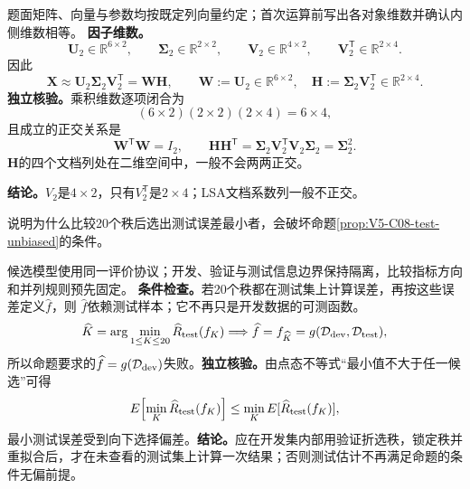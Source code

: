 \begin{solution}
\SolGiven 题面矩阵、向量与参数均按既定列向量约定；首次运算前写出各对象维数并确认内侧维数相等。
\SolDerive
\textbf{因子维数。}
\[
\boldsymbol U_2\in\mathbb R^{6\times2},\qquad
\boldsymbol\Sigma_2\in\mathbb R^{2\times2},\qquad
\boldsymbol V_2\in\mathbb R^{4\times2},\qquad
\boldsymbol V_2^{\mathsf T}\in\mathbb R^{2\times4}.
\]
因此
\[
\boldsymbol X\approx\boldsymbol U_2\boldsymbol\Sigma_2\boldsymbol V_2^{\mathsf T}
=\boldsymbol W\boldsymbol H,\qquad
\boldsymbol W:=\boldsymbol U_2\in\mathbb R^{6\times2},\quad
\boldsymbol H:=\boldsymbol\Sigma_2\boldsymbol V_2^{\mathsf T}
\in\mathbb R^{2\times4}.
\]
\textbf{独立核验。}乘积维数逐项闭合为
\[
(6\times2)(2\times2)(2\times4)=6\times4,
\]
且成立的正交关系是
\[
\boldsymbol W^{\mathsf T}\boldsymbol W=I_2,\qquad
\boldsymbol H\boldsymbol H^{\mathsf T}
=\boldsymbol\Sigma_2\boldsymbol V_2^{\mathsf T}\boldsymbol V_2\boldsymbol\Sigma_2
=\boldsymbol\Sigma_2^2.
\]
$\boldsymbol H$的四个文档列处在二维空间中，一般不会两两正交。

\textbf{结论。}$V_2$是$4\times2$，只有$V_2^{\mathsf T}$是$2\times4$；LSA文档系数列一般不正交。
\end{solution}
\begin{example}[锁定测试的条件无偏]\label{exm:V5-C08-holdout}
说明为什么比较20个秩后选出测试误差最小者，会破坏命题\ref{prop:V5-C08-test-unbiased}的条件。
\end{example}
\begin{solution}
\SolGiven 候选模型使用同一评价协议；开发、验证与测试信息边界保持隔离，比较指标方向和并列规则预先固定。
\SolDerive
\textbf{条件检查。}若20个秩都在测试集上计算误差，再按这些误差定义$\widehat f$，则
$\widehat f$依赖测试样本；它不再只是开发数据的可测函数。
\[
\widehat K=\arg\min_{1\le K\le20}\widehat R_{\rm test}(f_K)
\Longrightarrow
\widehat f=f_{\widehat K}=g(\mathcal D_{\rm dev},\mathcal D_{\rm test}),
\]
所以命题要求的$\widehat f=g(\mathcal D_{\rm dev})$失败。\textbf{独立核验。}由点态不等式“最小值不大于任一候选”可得
\[
E\!\left[\min_K\widehat R_{\rm test}(f_K)\right]
\le\min_KE[\widehat R_{\rm test}(f_K)],
\]
最小测试误差受到向下选择偏差。\textbf{结论。}应在开发集内部用验证折选秩，锁定秩并重拟合后，才在未查看的测试集上计算一次结果；否则测试估计不再满足命题的条件无偏前提。
\end{solution}

